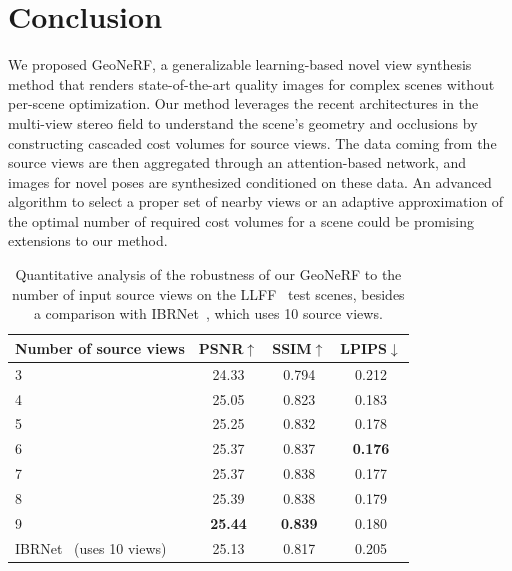 \section{Conclusion}
We proposed GeoNeRF, a generalizable learning-based novel view synthesis method that renders state-of-the-art quality images for complex scenes without per-scene optimization. Our method leverages the recent architectures in the multi-view stereo field to understand the scene's geometry and occlusions by constructing cascaded cost volumes for source views. The data coming from the source views are then aggregated through an attention-based network, and images for novel poses are synthesized conditioned on these data. An advanced algorithm to select a proper set of nearby views or an adaptive approximation of the optimal number of required cost volumes for a scene could be promising extensions to our method.

\begin{table}[!t]
\begin{center}
        \begin{tabular}{l|ccc}
        \hline
        Number of source views & PSNR$\uparrow$ & SSIM$\uparrow$ & LPIPS$\downarrow$  \\
        \hline
        3 & 24.33 & 0.794 & 0.212  \\
        4 & 25.05 & 0.823 & 0.183  \\
        5 & 25.25 & 0.832 & 0.178  \\
        6  & 25.37 & 0.837 & \textbf{0.176} \\
        7 & 25.37 & 0.838 & 0.177  \\
        8 & 25.39 & 0.838 & 0.179  \\
        9 & \textbf{25.44} & \textbf{0.839} & 0.180  \\
        \hline
        IBRNet~\citep{wang2021ibrnet} (uses 10 views) & 25.13 & 0.817 & 0.205  \\
        \hline
        \end{tabular}
    \end{center}
    \caption{Quantitative analysis of the robustness of our GeoNeRF to the number of input source views on the LLFF~\citep{mildenhall2019llff} test scenes, besides a comparison with IBRNet~\citep{wang2021ibrnet}, which uses 10 source views.}
    \label{table:n_views}
\end{table}

